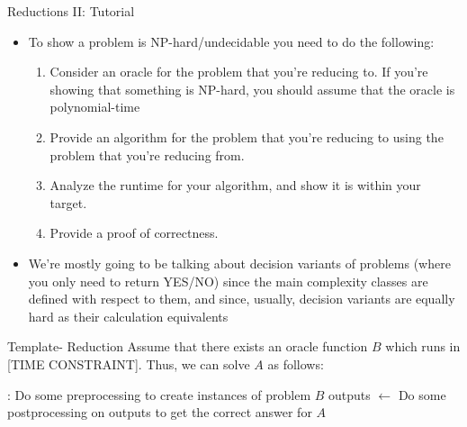 \documentclass{beamer}
\begin{document}
\begin{frame}[t]{Reductions II: Tutorial}
    \begin{itemize}
        \item To show a problem is NP-hard/undecidable you need to do the following:
        \begin{enumerate}
            \item \pause Consider an oracle for the problem that you're reducing to. If you're showing that something is NP-hard, you should assume that the oracle is polynomial-time
            \item  \pause Provide an algorithm for the problem that you're reducing to using the problem that you're reducing from.
            \item \pause Analyze the runtime for your algorithm, and show it is within your target.
            \item \pause Provide a proof of correctness.
        \end{enumerate}
        \item \pause We're mostly going to be talking about \alert{decision variants} of problems (where you only need to return YES/NO) since the main complexity classes are defined with respect to them, and since, usually, decision variants are equally hard as their calculation equivalents
    \end{itemize}
    \pause \begin{exampleblock}{Template- Reduction}
    Assume that there exists an oracle function $B$ which runs in [TIME CONSTRAINT]. Thus, we can solve $A$ as follows:
            \begin{algorithmic}[1]
                :
                    \State Do some preprocessing to create instances of problem $B$
                    \State outputs $\gets$ 
                    \State Do some postprocessing on outputs to get the correct answer for $A$
                \EndProcedure
            \end{algorithmic}
            
        \end{exampleblock}
\end{frame}
\end{document}
